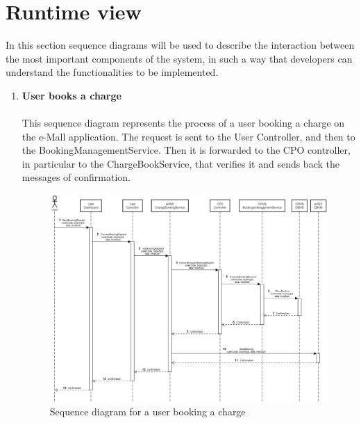 \documentclass[12pt]{report}
\begin{document}
\newpage
\section{Runtime view}
In this section sequence diagrams will be used to describe the interaction between the most important components of the system, in such a way that developers can understand the functionalities to be implemented.\\
\begin{enumerate}[1.]
    \item\textbf{User books a charge}\\
    \\
    This sequence diagram represents the process of a user booking a charge on the e-Mall application. The request is sent to the User Controller, and then to the BookingManagementService. Then it is forwarded to the CPO controller, in particular to the ChargeBookService, that verifies it and sends back the messages of confirmation.
    \\
    \begin{figure}[ht]
    \centering
    \includegraphics[width=\textwidth]{assets/sequencediagramBooking.png}
    \caption{Sequence diagram for a user booking a charge}
    \label{fig:my_label3423}
    \end{figure}


\end{enumerate}
\end{document}
